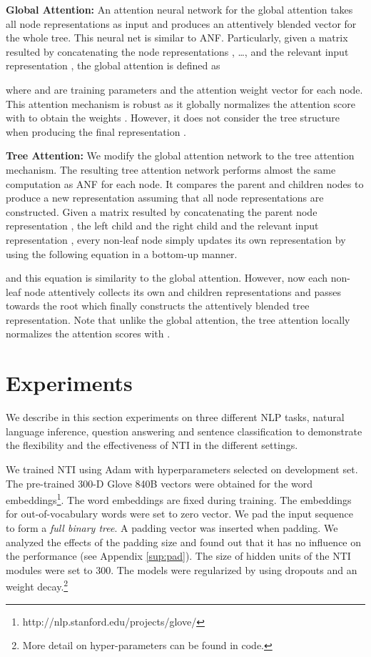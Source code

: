 \documentclass[11pt]{article}
\begin{document}
\textbf{Global Attention:} An attention neural network for the global attention takes all node representations as input and produces an attentively blended vector for the whole tree. This neural net is similar to ANF. Particularly, given a matrix  resulted by concatenating the node representations , \ldots,  and the relevant input representation , the global attention is defined as 




where  and  are training parameters and  the attention weight vector for each node. This attention mechanism is robust as it globally normalizes the attention score  with  to obtain the weights . However, it does not consider the tree structure when producing the final representation .

\textbf{Tree Attention:} We modify the global attention network to the tree attention mechanism. The resulting tree attention network performs almost the same computation as ANF for each node. It compares the parent and children nodes to produce a new representation assuming that all node representations are constructed. Given a matrix  resulted by concatenating the parent node representation , the left child  and the right child  and the relevant input representation , every non-leaf node  simply updates its own representation by using the following equation in a bottom-up manner.




and this equation is similarity to the global attention. However, now each non-leaf node attentively collects its own and children representations and passes towards the root which finally constructs the attentively blended tree representation. Note that unlike the global attention, the tree attention locally normalizes the attention scores with .

\section{Experiments}

We describe in this section experiments on three different NLP tasks, natural language inference, question answering and sentence classification to demonstrate the flexibility and the effectiveness of NTI in the different settings.

We trained NTI using Adam \cite{kingma:14} with hyperparameters selected on development set. The pre-trained 300-D Glove 840B vectors \cite{pennington:14} were obtained for the word embeddings\footnote{http://nlp.stanford.edu/projects/glove/}. The word embeddings are fixed during training. The embeddings for out-of-vocabulary words were set to zero vector. We pad the input sequence to form a \textit{full binary tree}. A padding vector was inserted when padding. We analyzed the effects of the padding size and found out that it has no influence on the performance (see Appendix \ref{sup:pad}). The size of hidden units of the NTI modules were set to 300. The models were regularized by using dropouts and an  weight decay.\footnote{More detail on hyper-parameters can be found in code.}
\end{document}
